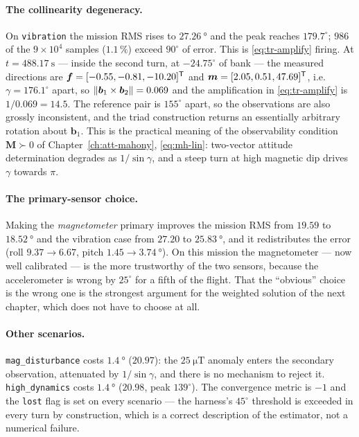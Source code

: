 \paragraph{The collinearity degeneracy.} On \texttt{vibration} the mission RMS rises to
$\SI{27.26}{\degree}$ and the peak reaches $179.7^\circ$; $986$ of the $9\times10^4$ samples
($1.1\,\%$) exceed $90^\circ$ of error. This is \eqref{eq:tr-amplify} firing. At
$t=\SI{488.17}{\second}$ --- inside the second turn, at $-24.75^\circ$ of bank --- the measured
directions are $\bm{f}=[-0.55,-0.81,-10.20]^{\mathsf{T}}$ and $\bm{m}=[2.05,0.51,47.69]^{\mathsf{T}}$, i.e.
$\gamma=176.1^\circ$ apart, so $\left\lVert \bm{b}_1\times\bm{b}_2 \right\rVert=0.069$ and the amplification in
\eqref{eq:tr-amplify} is $1/0.069=14.5$. The reference pair is $155^\circ$ apart, so the
observations are also grossly inconsistent, and the triad construction returns an essentially
arbitrary rotation about $\bm{b}_1$. This is the practical meaning of the observability condition
$\bm{M}\succ0$ of Chapter~\ref{ch:att-mahony}, \eqref{eq:mh-lin}: two-vector attitude determination
degrades as $1/\sin\gamma$, and a steep turn at high magnetic dip drives $\gamma$ towards $\pi$.

\paragraph{The primary-sensor choice.} Making the \emph{magnetometer} primary improves the mission
RMS from $19.59$ to $\SI{18.52}{\degree}$ and the vibration case from $27.20$ to
$\SI{25.83}{\degree}$, and it redistributes the error (roll $9.37\to6.67$, pitch
$1.45\to\SI{3.74}{\degree}$). On this mission the magnetometer --- now well calibrated --- is the
more trustworthy of the two sensors, because the accelerometer is wrong by $25^\circ$ for a fifth of
the flight. That the ``obvious'' choice is the wrong one is the strongest argument for the weighted
solution of the next chapter, which does not have to choose at all.

\paragraph{Other scenarios.} \texttt{mag\_disturbance} costs $\SI{1.4}{\degree}$ ($20.97$): the
$\SI{25}{\micro\tesla}$ anomaly enters the secondary observation, attenuated by $1/\sin\gamma$,
and there is no mechanism to reject it. \texttt{high\_dynamics} costs $\SI{1.4}{\degree}$ ($20.98$,
peak $139^\circ$). The convergence metric is $-1$ and the \texttt{lost} flag is set on every
scenario --- the harness's $45^\circ$ threshold is exceeded in every turn by construction, which is
a correct description of the estimator, not a numerical failure.


